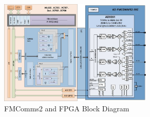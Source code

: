 \begin{figure}[htbp]
    \centering
    \includegraphics[width=0.65\textwidth]{./figures/fmcomms2_bd}
    \caption{ FMComms2 and FPGA Block Diagram
    \label{fig:fmcommbd}}
\end{figure}



